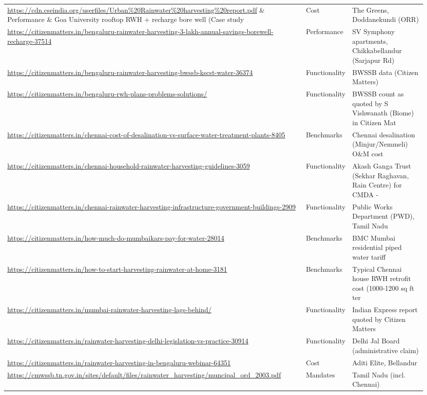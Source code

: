 {\begin{longtable}{p{9.2cm} p{2.5cm} p{4.2cm}}
\url{https://cdn.cseindia.org/userfiles/Urban%20Rainwater%20harvesting%20report.pdf} & Performance & Goa University rooftop RWH + recharge bore well (Case study \\
\url{https://citizenmatters.in/bengaluru-outer-ring-road-apartment-water-scarcity-bill-solution-rainwater-harvesting-monsoon-44485} & Cost & The Greens, Doddanekundi (ORR)\\
\url{https://citizenmatters.in/bengaluru-rainwater-harvesting-3-lakh-annual-savings-borewell-recharge-37514} & Performance & SV Symphony apartments, Chikkabellandur (Sarjapur Rd)\\
\url{https://citizenmatters.in/bengaluru-rainwater-harvesting-bwssb-kscst-water-36374} & Functionality & BWSSB data (Citizen Matters)\\
\url{https://citizenmatters.in/bengaluru-rwh-plans-problems-solutions/} & Functionality & BWSSB count as quoted by S Vishwanath (Biome) in Citizen Mat\\
\url{https://citizenmatters.in/chennai-cost-of-desalination-vs-surface-water-treatment-plants-8405} & Benchmarks & Chennai desalination (Minjur/Nemmeli) O\&M cost\\
\url{https://citizenmatters.in/chennai-household-rainwater-harvesting-guidelines-3059} & Functionality & Akash Ganga Trust (Sekhar Raghavan, Rain Centre) for CMDA - \\
\url{https://citizenmatters.in/chennai-rainwater-harvesting-infrastructure-government-buildings-2909} & Functionality & Public Works Department (PWD), Tamil Nadu\\
\url{https://citizenmatters.in/how-much-do-mumbaikars-pay-for-water-28014} & Benchmarks & BMC Mumbai residential piped water tariff\\
\url{https://citizenmatters.in/how-to-start-harvesting-rainwater-at-home-3181} & Benchmarks & Typical Chennai house RWH retrofit cost (1000-1200 sq ft ter\\
\url{https://citizenmatters.in/mumbai-rainwater-harvesting-lags-behind/} & Functionality & Indian Express report quoted by Citizen Matters\\
\url{https://citizenmatters.in/rainwater-harvesting-delhi-legislation-vs-practice-30914} & Functionality & Delhi Jal Board (administrative claim)\\
\url{https://citizenmatters.in/rainwater-harvesting-in-bengaluru-webinar-64351} & Cost & Aditi Elite, Bellandur\\
\url{https://cmwssb.tn.gov.in/sites/default/files/rainwater_harvesting/muncipal_ord_2003.pdf} & Mandates & Tamil Nadu (incl. Chennai)\\

\end{longtable}}
